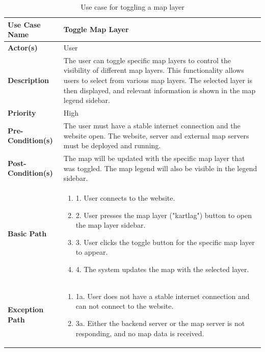 \begin{table}[h]
    \centering
    \begin{tabularx}{\textwidth}{|l|X|}
        \hline
        \rowcolor{gray!20}
        \textbf{Use Case Name} & Toggle Map Layer \\
        \hline
        \textbf{Actor(s)} & User \\
        \hline
        \textbf{Description} & The user can toggle specific map layers to control the visibility of different map layers. This functionality allows users to select from various map layers. The selected layer is then displayed, and relevant information is shown in the map legend sidebar. \\
        \hline
        \textbf{Priority} & High \\
        \hline
        \textbf{Pre-Condition(s)} & The user must have a stable internet connection and the website open. The website, server and external map servers must be deployed and running.\\
        \hline
        \textbf{Post-Condition(s)} & The map will be updated with the specific map layer that was toggled. The map legend will also be visible in the legend sidebar. \\
        \hline
        \textbf{Basic Path} &  
        \begin{enumerate}[label=,left=0pt]
            \item 1. User connects to the website.
            \item 2. User presses the map layer ("kartlag") button to open the map layer sidebar.
            \item 3. User clicks the toggle button for the specific map layer to appear.
            \item 4. The system updates the map with the selected layer.
        \end{enumerate} \\
        \hline
        \textbf{Exception Path} & 
        \begin{enumerate}[label=,left=0pt]
            \item 1a. User does not have a stable internet connection and can not connect to the website.
            \item 3a. Either the backend server or the map server is not responding, and no map data is received.
        \end{enumerate} \\
        \hline
    \end{tabularx}
    \caption[Use Case Specification: Toggle Map Layer]{Use case for toggling a map layer}
    \label{tab:use_case_toggle_layer}
\end{table}

